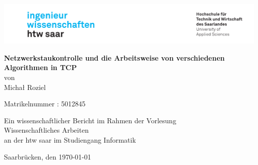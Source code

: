 \begin{titlepage}

\linespread{1.5}

\includegraphics[width=\linewidth]{graphics/htw_logo}

\begin{center}
    \large  
    \hfill
    \vfill
    \Large{\bfseries{Netzwerkstaukontrolle und die Arbeitsweise von verschiedenen Algorithmen in TCP}}\\
    
    von \\
    Michał Roziel

    Matrikelnummer : 5012845

    \vfill
		
    Ein wissenschaftlicher Bericht im Rahmen der Vorlesung\\
    \glqq Wissenschaftliches Arbeiten\grqq\\
    an der htw saar im Studiengang Informatik\\
	
    \vfill	
    \vfill
	
    Saarbrücken, den \today
\end{center}
    
\end{titlepage}
